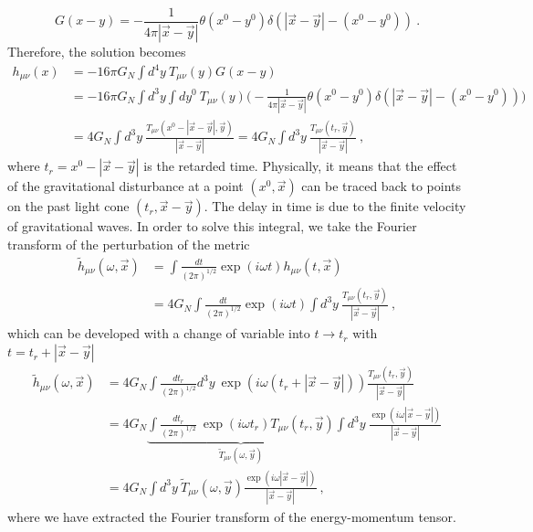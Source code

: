 \documentclass[a4paper]{article}
\begin{document}
    \begin{equation*}
        G (x - y) = - \frac{1}{4\pi |\vec x - \vec y|} \theta (x^0 - y^0) \delta (|\vec x - \vec y| - (x^0 - y^0)) ~.
    \end{equation*}
    Therefore, the solution becomes
    \begin{equation*}
    \begin{aligned}
        h_{\mu\nu}  (x) & = - 16 \pi G_N \int d^4 y ~ T_{\mu\nu} (y) G (x - y)  \\ & = - 16 \pi G_N \int d^3 y \int d y^0 ~T_{\mu\nu} (y) \Big (- \frac{1}{4\pi |\vec x - \vec y|} \theta ( x^0 - y^0) \delta (|\vec x - \vec y| - (x^0 - y^0)) \Big ) \\ & = 4 G_N \int d^3 y ~ \frac{T_{\mu\nu} (x^0 - |\vec x - \vec y|, \vec y) }{|\vec x - \vec y|} = 4 G_N \int d^3 y ~ \frac{T_{\mu\nu} (t_r, \vec y) }{|\vec x - \vec y|}~,
    \end{aligned}
    \end{equation*}
    where $t_r = x^0 - |\vec x - \vec y|$ is the retarded time. Physically, it means that the effect of the gravitational disturbance at a point $(x^0, \vec x)$ can be traced back to points on the past light cone $(t_r, \vec x - \vec y)$. The delay in time is due to the finite velocity of gravitational waves. In order to solve this integral, we take the Fourier transform of the perturbation of the metric  
    \begin{equation*}
    \begin{aligned}
        \tilde h_{\mu\nu} (\omega, \vec x) & = \int \frac{dt}{(2\pi)^{1/2}} \exp(i \omega t)  h _{\mu\nu} (t, \vec x) \\ & = 4 G_N \int \frac{dt}{(2\pi)^{1/2}} \exp(i \omega t) \int d^3 y ~ \frac{T_{\mu\nu} (t_r, \vec y)}{|\vec x - \vec y|}  ~,
    \end{aligned}
    \end{equation*}
    which can be developed with a change of variable into $t \rightarrow t_r$ with $t = t_r + |\vec x - \vec y|$ 
    \begin{equation*}
    \begin{aligned}
        \tilde h _{\mu\nu} (\omega, \vec x) & = 4 G_N \int \frac{dt_r}{(2\pi)^{1/2}} d^3 y ~ \exp(i \omega (t_r + |\vec x - \vec y|)) \frac{T_{\mu\nu} (t_r, \vec y)}{|\vec x - \vec y|}  \\ & = 4 G_N \underbrace{\int \frac{dt_r}{(2\pi)^{1/2}} ~ \exp(i \omega t_r) T_{\mu\nu} (t_r, \vec y) }_{\tilde T_{\mu\nu} (\omega, \vec{y})} \int d^3 y ~  \frac{\exp(i \omega |\vec x - \vec y|)}{|\vec x - \vec y|} \\ & = 4 G_N \int d^3 y ~ \tilde T_{\mu\nu} (\omega, \vec{y}) \frac{\exp(i \omega |\vec x - \vec y|)}{|\vec x - \vec y|} ~,
    \end{aligned}
    \end{equation*}
    where we have extracted the Fourier transform of the energy-momentum tensor.
\end{document}
